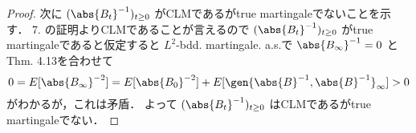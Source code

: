 \documentclass{jsarticle}
\begin{document}
\begin{enumerate}
\begin{proof}
        次に $(\abs{B_t}^{-1})_{t\ge0}$ がCLMであるがtrue martingaleでないことを示す．
        7. の証明よりCLMであることが言えるので $(\abs{B_t}^{-1})_{t\ge0}$ がtrue martingaleであると仮定すると $L^2$-bdd. martingale.
        a.s.で $\abs{B_\infty}^{-1}=0$ とThm. 4.13を合わせて
        $$
        0
        = E[\abs{B_\infty}^{-2}]
        = E[\abs{B_0}^{-2}]
        + E[\gen{\abs{B}^{-1}, \abs{B}^{-1}}_\infty]
        > 0
        $$
        がわかるが，これは矛盾．
        よって $(\abs{B_t}^{-1})_{t\ge0}$ はCLMであるがtrue martingaleでない．
    \end{proof}
\end{enumerate}
\end{document}
